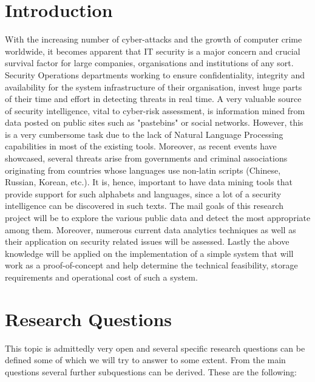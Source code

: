 \documentclass[12pt]{article}
\begin{document}
\tableofcontents

\newpage

\section*{Introduction}
With the increasing number of cyber-attacks and the growth of computer crime worldwide, it becomes apparent that IT security is a major concern and crucial survival factor for large companies, organisations and institutions of any sort. Security Operations departments working to ensure confidentiality, integrity and availability for the system infrastructure of their organisation, invest huge parts of their time and effort in detecting threats in real time. A very valuable source of security intelligence, vital to cyber-risk assessment, is information mined from data posted on public sites such as "pastebins" or social networks. However, this is a very cumbersome task due to the lack of Natural Language Processing capabilities in most of the existing tools. Moreover, as recent events have showcased, several threats arise from governments and criminal associations originating from countries whose languages use non-latin scripts (Chinese, Russian, Korean, etc.). It is, hence, important to have data mining tools that provide support for such alphabets and languages, since a lot of a security intelligence can be discovered in such texts. The mail goals of this research project will be to explore the various public data and detect the most appropriate among them. Moreover, numerous current data analytics techniques as well as their application on security related issues will be assessed. Lastly the above knowledge will be applied on the implementation of a simple system that will work as a proof-of-concept and help determine the technical feasibility, storage requirements and operational cost of such a system.  

\section{Research Questions}
This topic is admittedly very open and several specific research questions can be defined some of which we will try to answer to some extent. From the main questions several further subquestions can be derived. These are the following:
\end{document}
